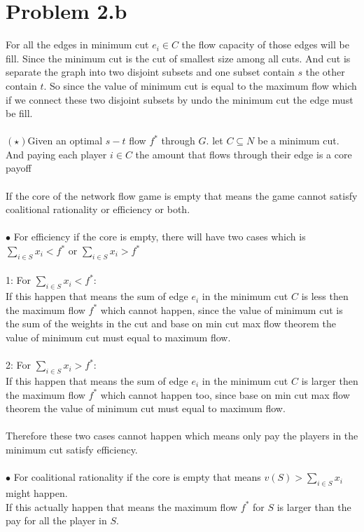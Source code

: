 \documentclass{article}
\begin{document}
\section{Problem 2.b}
For all the edges in minimum cut $e_i \in C$ the flow capacity of those edges will be fill. Since the minimum cut is the cut of smallest size among all cuts. And cut is separate the graph into two disjoint subsets and one subset contain $s$ the other contain $t$. So since the value of minimum cut is equal to the maximum flow which if we connect these two disjoint subsets by undo the minimum cut the edge must be fill.\\\\
$(\star)$Given an optimal $s-t$ flow $f^*$ through $G$. let $C \subseteq N$ be a minimum cut. And paying each player $i \in C$ the amount that flows through their edge is a core payoff\\\\
If the core of the network flow game is empty that means the game cannot satisfy coalitional rationality or efficiency or both.\\\\
$\bullet$ For efficiency if the core is empty, there will have two cases which is $\sum_{i \in S} x_i < f^*$ or $\sum_{i \in S} x_i > f^*$\\\\
1: For $\sum_{i \in S} x_i < f^*$:\\
If this happen that means the sum of edge $e_i$ in the minimum cut $C$ is less then the maximum flow $f^*$ which cannot happen, since the value of minimum cut is the sum of the weights in the cut and base on min cut max flow theorem the value of minimum cut must equal to maximum flow.\\\\
2: For $\sum_{i \in S} x_i > f^*$:\\
If this happen that means the sum of edge $e_i$ in the minimum cut $C$ is larger then the maximum flow $f^*$ which cannot happen too, since base on min cut max flow theorem the value of minimum cut must equal to maximum flow.\\\\
Therefore these two cases cannot happen which means only pay the players in the minimum cut satisfy efficiency.\\\\
$\bullet$ For coalitional rationality if the core is empty that means $v(S) > \sum_{i \in S} x_i$ might happen.\\
If this actually happen that means the maximum flow $f^*$ for $S$ is larger than the pay for all the player in $S$.\\\\
\end{document}
